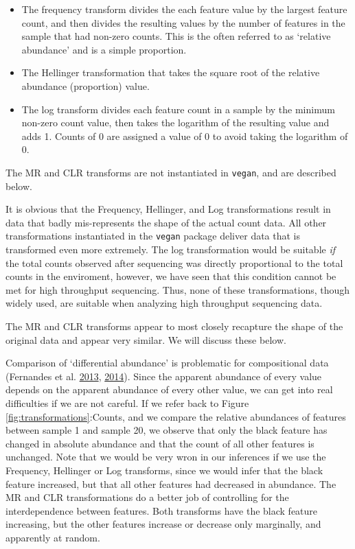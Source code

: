 \documentclass[onecolumn]{book}
\theoremstyle{definition}
\theoremstyle{definition}
\theoremstyle{definition}
\theoremstyle{remark}
\begin{document}
\begin{itemize}
\item
  The frequency transform divides the each feature value by the largest
  feature count, and then divides the resulting values by the number of
  features in the sample that had non-zero counts. This is the often
  referred to as `relative abundance' and is a simple proportion.
\item
  The Hellinger transformation that takes the square root of the
  relative abundance (proportion) value.
\item
  The log transform divides each feature count in a sample by the
  minimum non-zero count value, then takes the logarithm of the
  resulting value and adds 1. Counts of 0 are assigned a value of 0 to
  avoid taking the logarithm of 0.
\end{itemize}

The MR and CLR transforms are not instantiated in \texttt{vegan}, and
are described below.

It is obvious that the Frequency, Hellinger, and Log transformations
result in data that badly mis-represents the shape of the actual count
data. All other transformations instantiated in the \texttt{vegan}
package deliver data that is transformed even more extremely. The log
transformation would be suitable \emph{if} the total counts observed
after sequencing was directly proportional to the total counts in the
enviroment, however, we have seen that this condition cannot be met for
high throughput sequencing. Thus, none of these transformations, though
widely used, are suitable when analyzing high throughput sequencing
data.

The MR and CLR transforms appear to most closely recapture the shape of
the original data and appear very similar. We will discuss these below.

Comparison of `differential abundance' is problematic for compositional
data (Fernandes et al. \protect\hyperlink{ref-fernandes:2013}{2013},
\protect\hyperlink{ref-fernandes:2014}{2014}). Since the apparent
abundance of every value depends on the apparent abundance of every
other value, we can get into real difficulties if we are not careful. If
we refer back to Figure \ref{fig:transformations}:Counts, and we compare
the relative abundances of features between sample 1 and sample 20, we
observe that only the black feature has changed in absolute abundance
and that the count of all other features is unchanged. Note that we
would be very wron in our inferences if we use the Frequency, Hellinger
or Log transforms, since we would infer that the black feature
increased, but that all other features had decreased in abundance. The
MR and CLR transformations do a better job of controlling for the
interdependence between features. Both transforms have the black feature
increasing, but the other features increase or decrease only marginally,
and apparently at random.
\end{document}
